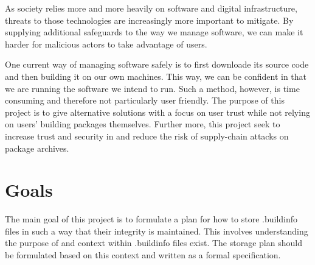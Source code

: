 \documentclass[english, biblatex, digitaloutput]{kththesis}
\begin{document}

As society relies more and more heavily on software and digital infrastructure, threats to those technologies are increasingly more important to mitigate. By supplying additional safeguards to the way we manage software, we can make it harder for malicious actors to take advantage of users.

One current way of managing software safely is to first downloade its source code and then building it on our own machines. This way, we can be confident in that we are running the software we intend to run. Such a method, however, is time consuming and therefore not particularly user friendly. The purpose of this project is to give alternative solutions with a focus on user trust while not relying on users' building packages themselves. Further more, this project seek to increase trust and security in  and reduce the risk of supply-chain attacks on package archives.


\section{Goals}

The main goal of this project is to formulate a plan for how to store .buildinfo files in such a way that their integrity is maintained. This involves understanding the purpose of and context within .buildinfo files exist. The storage plan should be formulated based on this context and written as a formal specification.


\end{document}
